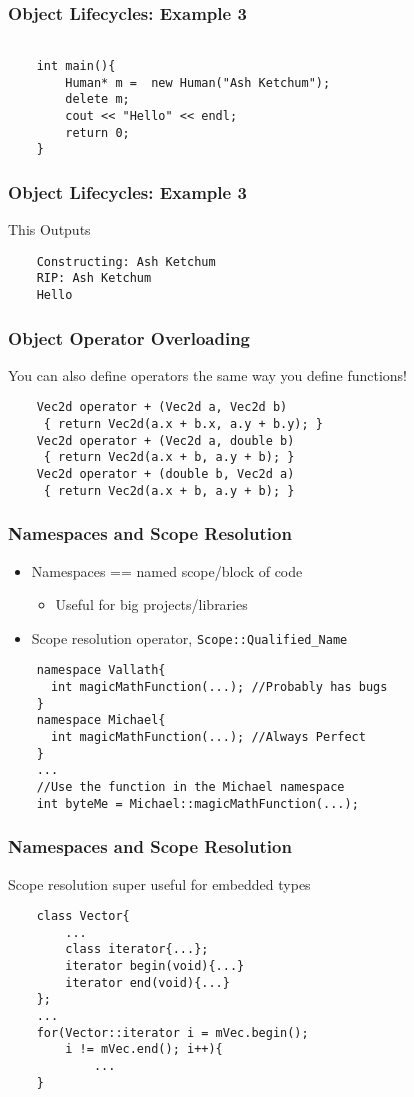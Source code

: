 \documentclass{beamer}
\begin{document}
\begin{frame}[fragile]
    \frametitle{Object Lifecycles: Example 3}
    \begin{verbatim}

    int main(){
        Human* m =  new Human("Ash Ketchum");
        delete m;
        cout << "Hello" << endl;
        return 0;
    }
    \end{verbatim}
\end{frame}
\begin{frame}[fragile]
    \frametitle{Object Lifecycles: Example 3}
    This Outputs
    \begin{verbatim}
    Constructing: Ash Ketchum
    RIP: Ash Ketchum
    Hello
    \end{verbatim}

\end{frame}

\begin{frame}[fragile]
    \frametitle{Object Operator Overloading }
    You can also define operators the same way you define functions!
    \begin{verbatim}
    Vec2d operator + (Vec2d a, Vec2d b) 
     { return Vec2d(a.x + b.x, a.y + b.y); }
    Vec2d operator + (Vec2d a, double b)
     { return Vec2d(a.x + b, a.y + b); }
    Vec2d operator + (double b, Vec2d a)
     { return Vec2d(a.x + b, a.y + b); }
    \end{verbatim}

\end{frame}

\begin{frame}[fragile]
    \frametitle{Namespaces and Scope Resolution}
    \begin{itemize}
    \item Namespaces == named scope/block of code
        \begin{itemize}
        \item Useful for big projects/libraries
        \end{itemize}
    \item Scope resolution operator, \texttt{Scope::Qualified\_Name}
    \end{itemize}
    \begin{verbatim}
    namespace Vallath{ 
      int magicMathFunction(...); //Probably has bugs 
    }
    namespace Michael{ 
      int magicMathFunction(...); //Always Perfect 
    }
    ...
    //Use the function in the Michael namespace
    int byteMe = Michael::magicMathFunction(...);
    \end{verbatim}
\end{frame}
\begin{frame}[fragile]
    \frametitle{Namespaces and Scope Resolution}
    Scope resolution super useful for embedded types
    \begin{verbatim}
    class Vector{
        ...
        class iterator{...};
        iterator begin(void){...}
        iterator end(void){...}
    };
    ...
    for(Vector::iterator i = mVec.begin();
        i != mVec.end(); i++){
            ...
    }
    \end{verbatim}
\end{frame}
\end{document}
